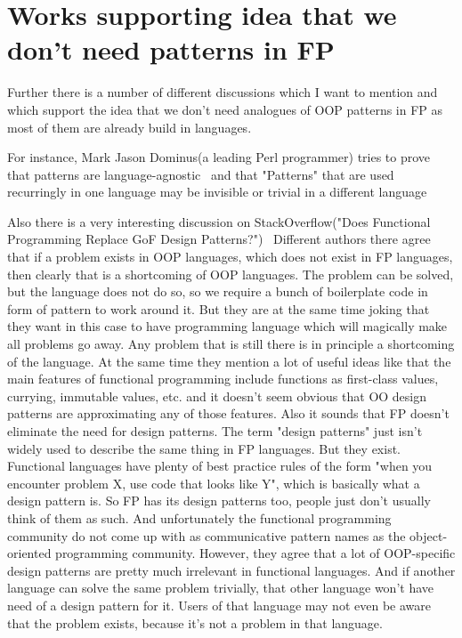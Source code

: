 \section{Works supporting idea that we don't need patterns in FP}
Further there is a number of different discussions which I want to mention and which support the idea that we don't need analogues of OOP patterns in FP as most of them are already build in languages.

For instance, Mark Jason Dominus(a leading Perl programmer) tries to prove that patterns are language-agnostic~\cite{res12} and that "Patterns" that are used recurringly in one language may be invisible or trivial in a different language

Also there is a very interesting discussion on StackOverflow("Does Functional Programming Replace GoF Design Patterns?")~\cite{res5}
Different authors there agree that if a problem exists in OOP languages, which does not exist in FP languages, then clearly that is a shortcoming of OOP languages. The problem can be solved, but the language does not do so, so we require a bunch of boilerplate code in form of pattern to work around it. But they are at the same time joking that they want in this case to have  programming language which will magically make all problems go away. Any problem that is still there is in principle a shortcoming of the language.
At the same time they mention a lot of useful ideas like that the main features of functional programming include functions as first-class values, currying, immutable values, etc. and it doesn't seem obvious that OO design patterns are approximating any of those features.
Also it sounds that FP doesn't eliminate the need for design patterns. The term "design patterns" just isn't widely used to describe the same thing in FP languages. But they exist. Functional languages have plenty of best practice rules of the form "when you encounter problem X, use code that looks like Y", which is basically what a design pattern is. So FP has its design patterns too, people just don't usually think of them as such. And unfortunately the functional programming community do not come up with as communicative pattern names as the object-oriented programming community.
However, they agree that a lot of OOP-specific design patterns are pretty much irrelevant in functional languages. And if another language can solve the same problem trivially, that other language won't have need of a design pattern for it. Users of that language may not even be aware that the problem exists, because it's not a problem in that language.
